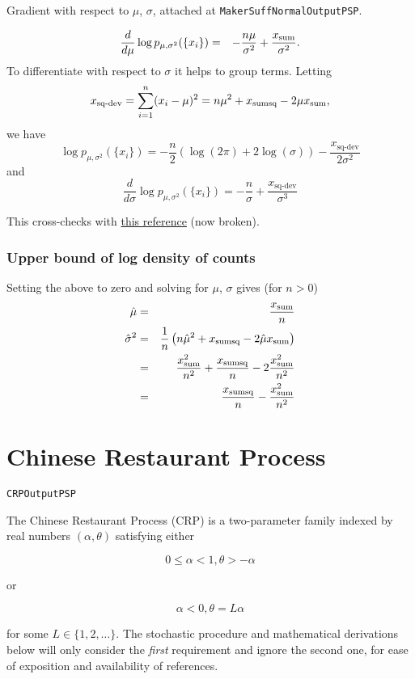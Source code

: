 \documentclass[12pt]{article}
\begin{document}
Gradient with respect to $\mu$, $\sigma$, attached at \texttt{MakerSuffNormalOutputPSP}.

\begin{eqnarray*}
\frac{d}{d\mu} \log p_{\mu,\sigma^2}(\{x_i\}) & = & -\frac{n\mu}{\sigma^2} +
    \frac{x_{\textrm{sum}}}{\sigma^2}.
\end{eqnarray*}
To differentiate with respect to $\sigma$ it helps to group terms.  Letting
\newcommand{\deviance}{x_{\textrm{sq-dev}}}
\[ \deviance = \sum_{i=1}^n (x_i - \mu)^2 = n\mu^2 + \xsumsq - 2 \mu \xsum, \]
we have
\[ \log p_{\mu,\sigma^2}(\{x_i\}) = -\frac{n}{2}(\log(2\pi) + 2\log(\sigma))
   - \frac{\deviance}{2\sigma^2} \]
and
\[ \frac{d}{d\sigma} \log p_{\mu,\sigma^2}(\{x_i\}) = -\frac{n}{\sigma} +
    \frac{\deviance}{\sigma^3} \]

This cross-checks with
\href{http://aleph0.clarku.edu/~djoyce/ma218/meeting12.pdf}{this reference} (now broken).

\subsubsection{Upper bound of log density of counts}

Setting the above to zero and solving for $\mu$, $\sigma$ gives (for $n > 0$)
\begin{eqnarray*}
 \hat\mu & = & \frac{x_{\textrm{sum}}}{n} \\
 \hat\sigma^2 & = & \frac{1}{n}\left(n\hat\mu^2 + x_{\textrm{sumsq}} -2\hat\mu x_{\textrm{sum}}\right) \\
  & = & \frac{x_{\textrm{sum}}^2}{n^2} + \frac{x_{\textrm{sumsq}}}{n} - 2\frac{x_{\textrm{sum}}^2}{n^2} \\
  & = & \frac{x_{\textrm{sumsq}}}{n} - \frac{x_{\textrm{sum}}^2}{n^2}
\end{eqnarray*}

\section{Chinese Restaurant Process}

\texttt{CRPOutputPSP}

The Chinese Restaurant Process (CRP) is a two-parameter family indexed by
real numbers $(\alpha, \theta)$ satisfying either

\[
0 \le \alpha < 1, \theta > - \alpha
\]

or

\[
\alpha < 0, \theta = L\alpha
\]

for some $L \in \{1,2,\dots\}$. The stochastic procedure and mathematical
derivations below will only consider the \textit{first} requirement and
ignore the second one, for ease of exposition and availability of references.
\end{document}

